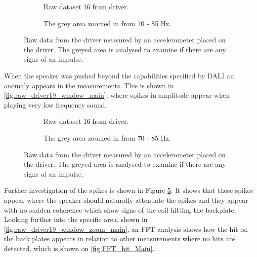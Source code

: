 \begin{figure}[H]
\centering
\begin{subfigure}[t]{0.55\textwidth}
	
	\caption{Raw dataset 16 from driver.}
	\label{fig:Driver1Report}
\end{subfigure}
\begin{subfigure}[t]{0.43\textwidth}
	
	\caption{The grey area zoomed in from 70 - 85 Hz.}
	\label{fig:Enclosure1Report}
\end{subfigure}
\caption{Raw data from the driver measured by an accelerometer placed on the driver. The greyed area is analysed to examine if there are any signs of an impulse.}
\label{fig:dataset1}
\end{figure}
\vspace{-5mm}
When the speaker was pushed beyond the capabilities specified by DALI an anomaly appears in the measurements. This is shown in \autoref{fig:raw_driver19_window_main}, where spikes in amplitude appear when playing very low frequency sound. 

\begin{figure}[H]
\centering
\begin{subfigure}[t]{0.55\textwidth}
	
	\caption{Raw dataset 16 from driver.}
	\label{fig:raw_driver19_window_main}
\end{subfigure}
\begin{subfigure}[t]{0.43\textwidth}
	
	\caption{The grey area zoomed in from 70 - 85 Hz.}
	\label{fig:raw_driver19_window_zoom_main}
\end{subfigure}
\caption{Raw data from the driver measured by an accelerometer placed on the driver. The greyed area is analysed to examine if there are any signs of an impulse.}
\label{fig:raw_driver19_windows_main}
\end{figure}

Further investigation of the spikes is shown in Figure \ref{fig:raw_driver19_window_zoom_main}. It shows that these spikes appear where the speaker should naturally attenuate the spikes and they appear with no sudden coherence which show signs of the coil hitting the backplate. Looking further into the specific area, shown in \autoref{fig:raw_driver19_window_zoom_main}, an FFT analysis shows how the hit on the back plates appears in relation to other measurements where no hits are detected, which is shown on \autoref{fig:FFT_hit_Main}.

